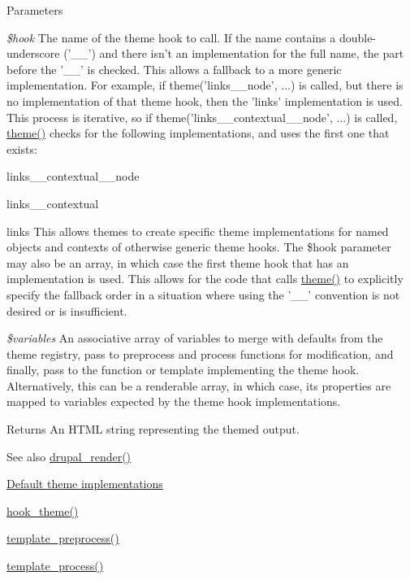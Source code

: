 \begin{DoxyParams}{Parameters}
\item[{\em \$hook}]The name of the theme hook to call. If the name contains a double-\/underscore ('\_\-\_\-') and there isn't an implementation for the full name, the part before the '\_\-\_\-' is checked. This allows a fallback to a more generic implementation. For example, if theme('links\_\-\_\-node', ...) is called, but there is no implementation of that theme hook, then the 'links' implementation is used. This process is iterative, so if theme('links\_\-\_\-contextual\_\-\_\-node', ...) is called, \hyperlink{includes_2theme_8inc_a7c25609a935874541a19657affd30fff}{theme()} checks for the following implementations, and uses the first one that exists:
\begin{DoxyItemize}
\item links\_\-\_\-contextual\_\-\_\-node
\item links\_\-\_\-contextual
\item links This allows themes to create specific theme implementations for named objects and contexts of otherwise generic theme hooks. The \$hook parameter may also be an array, in which case the first theme hook that has an implementation is used. This allows for the code that calls \hyperlink{includes_2theme_8inc_a7c25609a935874541a19657affd30fff}{theme()} to explicitly specify the fallback order in a situation where using the '\_\-\_\-' convention is not desired or is insufficient. 
\end{DoxyItemize}\item[{\em \$variables}]An associative array of variables to merge with defaults from the theme registry, pass to preprocess and process functions for modification, and finally, pass to the function or template implementing the theme hook. Alternatively, this can be a renderable array, in which case, its properties are mapped to variables expected by the theme hook implementations.\end{DoxyParams}
\begin{DoxyReturn}{Returns}
An HTML string representing the themed output.
\end{DoxyReturn}
\begin{DoxySeeAlso}{See also}
\hyperlink{common_8inc_a05798b44e8d6c496d4bee5cc32fa7851}{drupal\_\-render()} 

\hyperlink{group__themeable}{Default theme implementations} 

\hyperlink{group__hooks_ga013ccb45c7aaab1c16cf9691428c910d}{hook\_\-theme()} 

\hyperlink{includes_2theme_8inc_a3eeb7bcdba7ef4859f99586da264d347}{template\_\-preprocess()} 

\hyperlink{includes_2theme_8inc_a9b4d56c55dab2c59b7af6f71d6b1a940}{template\_\-process()} 
\end{DoxySeeAlso}
